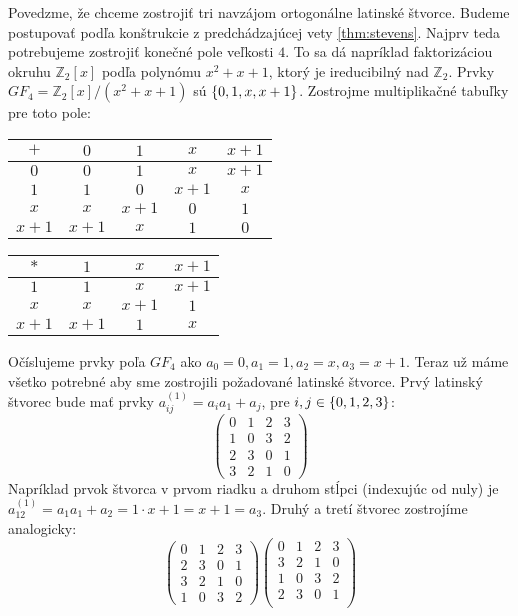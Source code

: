 \begin{example}
Povedzme, že chceme zostrojiť tri navzájom ortogonálne latinské štvorce. Budeme postupovať podľa konštrukcie z predchádzajúcej vety \ref{thm:stevens}. Najprv teda potrebujeme zostrojiť konečné pole veľkosti $4$. To sa dá napríklad faktorizáciou okruhu $\mathbb{Z}_2[x]$ podľa polynómu $x^2 + x + 1$, ktorý je ireducibilný nad $\mathbb{Z}_2$. Prvky $GF_4 = \mathbb{Z}_2[x]/(x^2 + x + 1)$ sú $\left\{0, 1, x, x+1\right\}$. Zostrojme multiplikačné tabuľky pre toto pole:
\begin{center}
    \begin{tabular}{|c||c c c c|}
        \hline
        $+$ & $0$ & $1$ & $x$ & $x + 1$ \\ 
        \hline
        \hline
        $0$ & $0$ & $1$ & $x$ & $x + 1$ \\ 
        $1$ & $1$ & $0$ & $x + 1$ & $x$ \\
        $x$ & $x$ & $x + 1$ & $0$ & $1$ \\ 
        $x + 1$ & $x + 1$ & $x$ & $1$ & $0$ \\
        \hline
    \end{tabular}
    \begin{tabular}{|c||c c c|}
        \hline
        $*$ & $1$ & $x$ & $x + 1$ \\ 
        \hline
        \hline
        $1$ & $1$ & $x$ & $x + 1$ \\
        $x$ & $x$ & $x + 1$ & $1$ \\ 
        $x + 1$ & $x + 1$ & $1$ & $x$ \\
        \hline
    \end{tabular}
\end{center}
Očíslujeme prvky poľa $GF_4$ ako $a_0 = 0, a_1 = 1, a_2 = x, a_3 = x+1$. Teraz už máme všetko potrebné aby sme zostrojili požadované latinské štvorce. Prvý latinský štvorec bude mať prvky $a_{ij}^{(1)} = a_i a_1 + a_j$, pre $i, j \in \left\{0, 1, 2, 3\right\}$:
$$
\begin{pmatrix}
    0 & 1 & 2 & 3\\
    1 & 0 & 3 & 2\\
    2 & 3 & 0 & 1\\
    3 & 2 & 1 & 0
\end{pmatrix}
$$
Napríklad prvok štvorca v prvom riadku a druhom stĺpci (indexujúc od nuly) je $a_{12}^{(1)} = a_1 a_1 + a_2 = 1 \cdot x + 1 = x + 1 = a_3$. Druhý a tretí štvorec zostrojíme analogicky:
$$
\begin{pmatrix}
    0 & 1 & 2 & 3\\
    2 & 3 & 0 & 1\\
    3 & 2 & 1 & 0\\
    1 & 0 & 3 & 2
\end{pmatrix}
\begin{pmatrix}
    0 & 1 & 2 & 3\\
    3 & 2 & 1 & 0\\
    1 & 0 & 3 & 2\\
    2 & 3 & 0 & 1\\
\end{pmatrix}
$$
\end{example}

